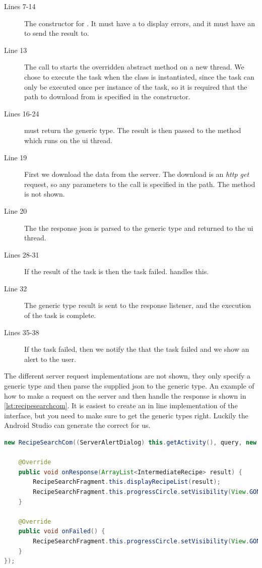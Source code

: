 \begin{description}
\item[Lines 7-14] The constructor for . It must have a \linebreak{} to display errors, and it must have an  to send the result to.
\item[Line 13] The call to  starts the overridden abstract method \linebreak{} on a new thread. We chose to execute the task when the class is instantiated, since the task can only be executed once per instance of the task, so it is required that the path to download from is specified in the constructor.
\item[Lines 16-24]  must return the generic type. The result is then passed to the method  which runs on the \ac{ui} thread.
\item[Line 19] First we download the data from the server. The download is an \textit{http get} request, so any parameters to the call is specified in the path. The  method is not shown.
\item[Line 20] The the response \ac{json} is parsed to the generic type and returned to the \ac{ui} thread.
\item[Lines 28-31] If the result of the task is  then the task failed.  handles this.
\item[Line 32] The generic type result is sent to the response listener, and the execution of the task is complete.
\item[Lines 35-38] If the task failed, then we notify the  that the task failed and we show an alert to the user.
\end{description}
The different server request implementations are not shown, they only specify a generic type and then parse the supplied \ac{json} to the generic type. An example of how to make a request on the server and then handle the response is shown in \autoref{lst:recipesearchcom}. It is easiest to create an in line implementation of the  interface, but you need to make sure to get the generic types right. Luckily the Android Studio can generate the correct  for us.

\begin{lstlisting}[language=java, label=lst:recipesearchcom, caption={Search for recipes by text}]
new RecipeSearchCom((ServerAlertDialog) this.getActivity(), query, new OnResponseListener<ArrayList<IntermediateRecipe>>() {
    
    @Override
    public void onResponse(ArrayList<IntermediateRecipe> result) {
        RecipeSearchFragment.this.displayRecipeList(result);
        RecipeSearchFragment.this.progressCircle.setVisibility(View.GONE);
    }

    @Override
    public void onFailed() {
        RecipeSearchFragment.this.progressCircle.setVisibility(View.GONE);
    }
});
\end{lstlisting}

